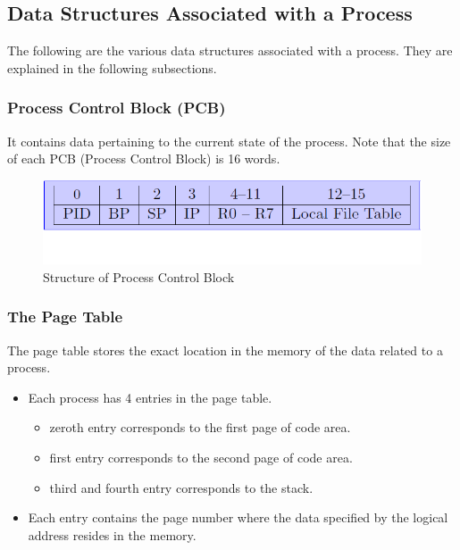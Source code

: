 \documentclass[11pt]{article}
\begin{document}
\subsection{Data Structures Associated with a Process}
The following are the various data structures associated with a process. They are explained in the following subsections.

\subsubsection{Process Control Block (PCB)}
It contains data pertaining to the current state of the process.
Note that the size of each PCB (Process Control Block) is 16 words.

\begin{figure}
\begin{center}
\includegraphics[scale=0.5]{pcbblockdiagram.png}
\end{center}
\caption{Structure of Process Control Block}
\end{figure}

\subsubsection{The Page Table}
The page table stores the exact location in the memory of the data related to a process.
\begin{itemize}
\item Each process has 4 entries in the page table.
\begin{itemize}
\item zeroth entry corresponds to the first page of code area.
\item first entry corresponds to the second page of code area.
\item third and fourth entry corresponds to the stack.
\end{itemize}
\item Each entry contains the page number where the data specified by the logical address resides in the memory.
\end{itemize}
\end{document}
